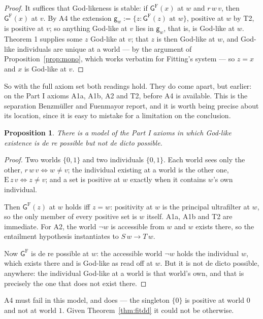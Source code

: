 \documentclass[11pt]{article}
\theoremstyle{plain}
\newtheorem{proposition}[theorem]{Proposition}
\theoremstyle{definition}
\newcommand{\Gd}{\mathsf{G}}
\newcommand{\gd}{\mathsf{g}}
\begin{document}
\begin{proof}
It suffices that God-likeness is stable: if $\Gd^{\mathrm{F}}(x)$ at $w$ and
$r\,w\,v$, then $\Gd^{\mathrm{F}}(x)$ at $v$. By A4 the extension
$\gd_w := \{z : \Gd^{\mathrm{F}}(z)\text{ at }w\}$, positive at $w$ by T2,
is positive at $v$; so anything God-like at $v$ lies in $\gd_w$, that is, is
God-like at $w$. Theorem 1 supplies some $z$ God-like at $v$; that $z$ is then
God-like at $w$, and God-like individuals are unique at a world --- by the
argument of Proposition~\ref{prop:mono}, which works verbatim for Fitting's
system --- so $z = x$ and $x$ is God-like at $v$.
\end{proof}

\noindent
So with the full axiom set both readings hold. They do come apart, but earlier:
on the Part I axioms A1a, A1b, A2 and T2, before A4 is available. This is the
separation Benzm\"uller and Fuenmayor report, and it is worth being precise
about its location, since it is easy to mistake for a limitation on the
conclusion.

\begin{proposition}\label{prop:dd}
There is a model of the Part I axioms in which God-like existence is de re
possible but not de dicto possible.
\end{proposition}

\begin{proof}
Two worlds $\{0,1\}$ and two individuals $\{0,1\}$. Each world sees only the
other, $r\,w\,v \iff w \neq v$; the individual existing at a world is the other
one, $\mathrm{E}\,z\,v \iff z \neq v$; and a set is positive at $w$ exactly
when it contains $w$'s own individual.

Then $\Gd^{\mathrm{F}}(z)$ at $w$ holds iff $z = w$: positivity at $w$ is the
principal ultrafilter at $w$, so the only member of every positive set is $w$
itself. A1a, A1b and T2 are immediate. For A2, the world $\lnot w$ is
accessible from $w$ and $w$ exists there, so the entailment hypothesis
instantiates to $S\,w \to T\,w$.

Now $\Gd^{\mathrm{F}}$ is de re possible at $w$: the accessible world $\lnot w$
holds the individual $w$, which exists there and is God-like as read off at
$w$. But it is not de dicto possible, anywhere: the individual God-like at a
world is that world's own, and that is precisely the one that does not exist
there.
\end{proof}

\noindent
A4 must fail in this model, and does --- the singleton $\{0\}$ is positive at
world $0$ and not at world $1$. Given Theorem~\ref{thm:fitdd} it could not be
otherwise.
\end{document}
